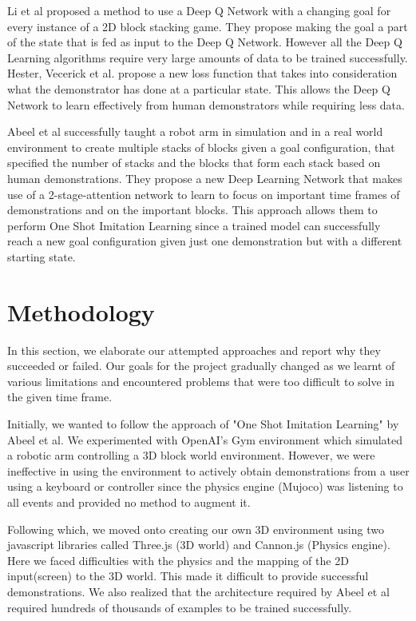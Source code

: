 \documentclass[letterpaper, 12 pt, conference]{ieeeconf}
\begin{document}
Li et al \cite{DBLP:journals/corr/abs-1711-00267} proposed a method to use a Deep Q Network with a changing goal for every instance of a 2D block stacking game. They propose making the goal a part of the state that is fed as input to the Deep Q Network. However all the Deep Q Learning algorithms require very large amounts of data to be trained successfully. Hester, Vecerick et al.\cite{hester2017deep} propose a new loss function that takes into consideration what the  demonstrator has done at a particular state. This allows the Deep Q Network to learn effectively from human demonstrators while requiring less data.

Abeel et al\cite{duan2017one} successfully taught a robot arm in simulation and in a real world environment to create multiple stacks of blocks given a goal configuration, that specified the number of stacks and the blocks that form each stack based on human demonstrations. They propose a new Deep Learning Network that makes use of a 2-stage-attention network to learn to focus on important time frames of demonstrations and on the important blocks. This approach allows them to perform One Shot Imitation Learning since a trained model can successfully reach a new goal configuration given just one demonstration but with a different starting state.


\section{Methodology}

In this section, we elaborate our attempted approaches and report why they succeeded or failed. Our goals for the project gradually changed as we learnt of various limitations and encountered problems that were too difficult to solve in the given time frame.

Initially, we wanted to follow the approach of "One Shot Imitation Learning" by Abeel et al\cite{duan2017one}. We experimented with OpenAI’s Gym\cite{openaigym} environment which simulated a robotic arm controlling a 3D block world environment. However, we were ineffective in using the environment to actively obtain demonstrations from a user using a keyboard or controller since the physics engine (Mujoco\cite{mujoco}) was listening to all events and provided no method to augment it.

Following which, we moved onto creating our own 3D environment using two javascript libraries called Three.js \cite{threejs}(3D world) and Cannon.js\cite{cannonjs} (Physics engine). Here we faced difficulties with the physics and the mapping of the 2D input(screen) to the 3D world. This made it difficult to provide successful demonstrations. We also realized that the architecture required by Abeel et al\cite{duan2017one} required hundreds of thousands of examples to be trained successfully.
\end{document}
